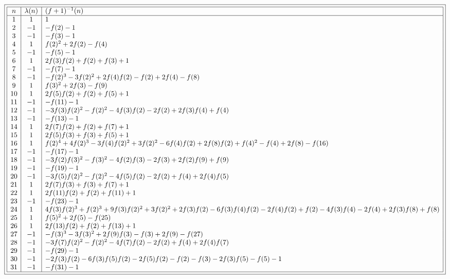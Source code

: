 \documentclass[11pt,reqno,a4letter]{article}
\numberwithin{figure}{section}
\numberwithin{table}{section}
\theoremstyle{plain}
\numberwithin{theorem}{section}
\theoremstyle{definition}
\begin{document}
\begin{table}[h!]

\centering

\tiny
\begin{equation*}
\boxed{
\begin{array}{|c|c|l|} \hline 
n & \lambda(n) & (f+1)^{-1}(n) \\ \hline 
 1 & 1 & 1 \\
 2 & -1 & -f(2)-1 \\
 3 & -1 & -f(3)-1 \\
 4 & 1 & f(2)^2+2 f(2)-f(4) \\
 5 & -1 & -f(5)-1 \\
 6 & 1 & 2 f(3) f(2)+f(2)+f(3)+1 \\
 7 & -1 & -f(7)-1 \\
 8 & -1 & -f(2)^3-3 f(2)^2+2 f(4) f(2)-f(2)+2 f(4)-f(8) \\
 9 & 1 & f(3)^2+2 f(3)-f(9) \\
 10 & 1 & 2 f(5) f(2)+f(2)+f(5)+1 \\
 11 & -1 & -f(11)-1 \\
 12 & -1 & -3 f(3) f(2)^2-f(2)^2-4 f(3) f(2)-2 f(2)+2 f(3) f(4)+f(4) \\
 13 & -1 & -f(13)-1 \\
 14 & 1 & 2 f(7) f(2)+f(2)+f(7)+1 \\
 15 & 1 & 2 f(5) f(3)+f(3)+f(5)+1 \\
 16 & 1 & f(2)^4+4 f(2)^3-3 f(4) f(2)^2+3 f(2)^2-6 f(4) f(2)+2 f(8) f(2)+f(4)^2-f(4)+2 f(8)-f(16) \\
 17 & -1 & -f(17)-1 \\
 18 & -1 & -3 f(2) f(3)^2-f(3)^2-4 f(2) f(3)-2 f(3)+2 f(2) f(9)+f(9) \\
 19 & -1 & -f(19)-1 \\
 20 & -1 & -3 f(5) f(2)^2-f(2)^2-4 f(5) f(2)-2 f(2)+f(4)+2 f(4) f(5) \\
 21 & 1 & 2 f(7) f(3)+f(3)+f(7)+1 \\
 22 & 1 & 2 f(11) f(2)+f(2)+f(11)+1 \\
 23 & -1 & -f(23)-1 \\
 24 & 1 & 4 f(3) f(2)^3+f(2)^3+9 f(3) f(2)^2+3 f(2)^2+2 f(3) f(2)-6 f(3) f(4) f(2)-2 f(4) f(2)+f(2)-4 f(3) f(4)-2 f(4)+2 f(3) f(8)+f(8) \\
 25 & 1 & f(5)^2+2 f(5)-f(25) \\
 26 & 1 & 2 f(13) f(2)+f(2)+f(13)+1 \\
 27 & -1 & -f(3)^3-3 f(3)^2+2 f(9) f(3)-f(3)+2 f(9)-f(27) \\
 28 & -1 & -3 f(7) f(2)^2-f(2)^2-4 f(7) f(2)-2 f(2)+f(4)+2 f(4) f(7) \\
 29 & -1 & -f(29)-1 \\
 30 & -1 & -2 f(3) f(2)-6 f(3) f(5) f(2)-2 f(5) f(2)-f(2)-f(3)-2 f(3) f(5)-f(5)-1 \\
 31 & -1 & -f(31)-1 \\ 
   \hline 
\end{array}
}
\end{equation*} 


\end{table}
\end{document}
